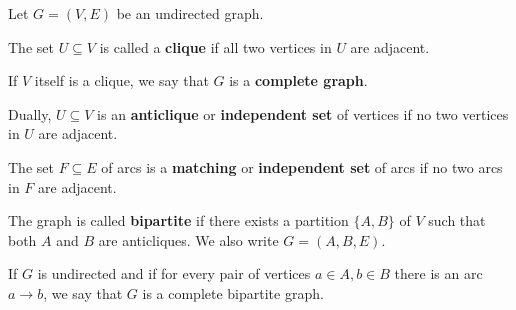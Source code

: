 \begin{definition}\label{def:graph_adjacency}
  Let $G = (V, E)$ be an undirected graph.

  \begin{defenum}
    \cite[chapter 1, section 1.4]{Gondran1984} The set \( U \subseteq V \) is called a \textbf{clique} if all two vertices in \( U \) are adjacent.

    \cite[chapter 1, section 1.4]{Gondran1984} If \( V \) itself is a clique, we say that \( G \) is a \textbf{complete graph}.

    \cite[120]{Erickson2019} Dually, \( U \subseteq V \) is an \textbf{anticlique} or \textbf{independent set} of vertices if no two vertices in \( U \) are adjacent.

    \cite[chapter 5, exercise 11]{Gondran1984} The set \( F \subseteq E \) of arcs is a \textbf{matching} or \textbf{independent set} of arcs if no two arcs in \( F \) are adjacent.

    \cite[7]{Gondran1984} The graph is called \textbf{bipartite} if there exists a partition \( \{ A, B \} \) of \( V \) such that both \( A \) and \( B \) are anticliques. We also write \( G = (A, B, E) \).

    If \( G \) is undirected and if for every pair of vertices \( a \in A, b \in B \) there is an arc \( a \to b \), we say that \( G \) is a complete bipartite graph.
  \end{defenum}
\end{definition}

